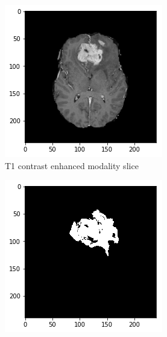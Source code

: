 \begin{figure}[H]
    \centering
    \begin{subfigure}[t]{.21\textwidth}
        \centering
        \includegraphics[width=\linewidth]{chapters/06_hdm/c_Brats18_2013_17_1_L1/46.png}
        \caption{T1 contrast enhanced modality slice}
    \end{subfigure}%
    \begin{subfigure}[t]{.21\textwidth}
        \centering
        \includegraphics[width=\linewidth]{chapters/06_hdm/c_Brats18_2013_17_1_L1/45.png}

\end{subfigure}
\end{figure}
